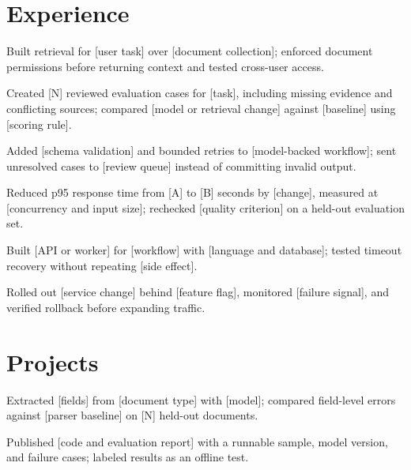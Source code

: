 \documentclass{resume}
\begin{document}

\section{Experience}

\begin{jobduties}
  \item Built retrieval for [user task] over [document collection]; enforced document permissions before returning context and tested cross-user access.
  \item Created [N] reviewed evaluation cases for [task], including missing evidence and conflicting sources; compared [model or retrieval change] against [baseline] using [scoring rule].
  \item Added [schema validation] and bounded retries to [model-backed workflow]; sent unresolved cases to [review queue] instead of committing invalid output.
  \item Reduced p95 response time from [A] to [B] seconds by [change], measured at [concurrency and input size]; rechecked [quality criterion] on a held-out evaluation set.
\end{jobduties}

\begin{jobduties}
  \item Built [API or worker] for [workflow] with [language and database]; tested timeout recovery without repeating [side effect].
  \item Rolled out [service change] behind [feature flag], monitored [failure signal], and verified rollback before expanding traffic.
\end{jobduties}

\section{Projects}

\begin{jobduties}
  \item Extracted [fields] from [document type] with [model]; compared field-level errors against [parser baseline] on [N] held-out documents.
  \item Published [code and evaluation report] with a runnable sample, model version, and failure cases; labeled results as an offline test.
\end{jobduties}
\end{document}
